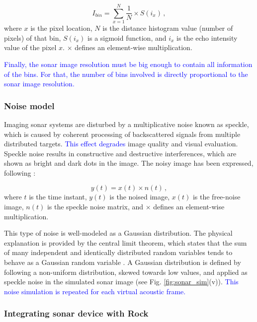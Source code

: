 \documentclass[final,5p,times]{elsarticle}
\begin{document}
\begin{equation}
    \label{eq:1}
    I_{bin} = \sum\limits_{x=1}^N \frac{1}{N} \times S(i_{x}) \, ,
\end{equation}
where $x$ is the pixel location, $N$ is the distance histogram
value (number of pixels) of that bin, $S(i_{x})$ is a sigmoid function,
and $i_{x}$ is the echo intensity value of the pixel $x$. $\times$ defines an
element-wise multiplication.

\textcolor{blue}{Finally, the sonar image resolution must be big enough to contain all information of the bins. For that, the number of bins involved is directly proportional to the sonar image resolution.}

\subsubsection{Noise model}
\label{dev:noise}

Imaging sonar systems are disturbed by a multiplicative noise known as speckle,
which is caused by coherent processing of backscattered signals from multiple
distributed targets. \textcolor{blue}{This effect degrades} image quality and visual evaluation. Speckle noise results in constructive and destructive interferences,
which are shown as bright and dark dots in the image. The noisy image has been
expressed, following \cite{lee1980}:

\begin{equation}
\label{eq:2}
y(t) = x(t) \times n(t) \, ,
\end{equation}
where $t$ is the time instant, $y(t)$ is the noised image, $x(t)$ is the
free-noise image, $n(t)$ is the speckle noise matrix, and $\times$ defines an
element-wise multiplication.

This type of noise is well-modeled as a Gaussian distribution. The physical explanation is provided by the central limit theorem, which states that the
sum of many independent and identically distributed random variables tends
to behave as a Gaussian random variable \textcolor{blue}{\cite{papoulis2002}}. A Gaussian distribution is defined by following a non-uniform distribution, skewed towards low values, and applied as speckle noise in the simulated sonar image (see Fig. \ref{fig:sonar_sim}(v)). \textcolor{blue}{This noise simulation is repeated for each virtual acoustic frame.}

\subsubsection{Integrating sonar device with Rock}
\label{dev:rock}
\end{document}
